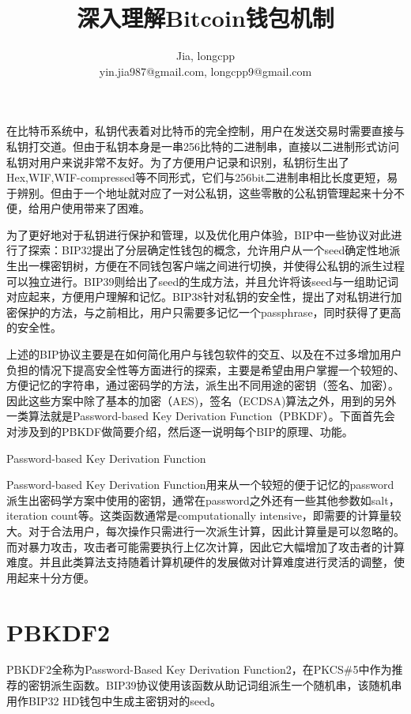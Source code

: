 \documentclass{article}
\begin{document}
\title{深入理解Bitcoin钱包机制}
\author{Jia, longcpp \\ \small{yin.jia987@gmail.com, longcpp9@gmail.com}}

\maketitle


在比特币系统中，私钥代表着对比特币的完全控制，用户在发送交易时需要直接与私钥打交道。但由于私钥本身是一串256比特的二进制串，直接以二进制形式访问私钥对用户来说非常不友好。为了方便用户记录和识别，私钥衍生出了Hex,WIF,WIF-compressed等不同形式，它们与256bit二进制串相比长度更短，易于辨别。但由于一个地址就对应了一对公私钥，这些零散的公私钥管理起来十分不便，给用户使用带来了困难。

为了更好地对于私钥进行保护和管理，以及优化用户体验，BIP中一些协议对此进行了探索：BIP32提出了分层确定性钱包的概念，允许用户从一个seed确定性地派生出一棵密钥树，方便在不同钱包客户端之间进行切换，并使得公私钥的派生过程可以独立进行。BIP39则给出了seed的生成方法，并且允许将该seed与一组助记词对应起来，方便用户理解和记忆。BIP38针对私钥的安全性，提出了对私钥进行加密保护的方法，与之前相比，用户只需要多记忆一个passphrase，同时获得了更高的安全性。

上述的BIP协议主要是在如何简化用户与钱包软件的交互、以及在不过多增加用户负担的情况下提高安全性等方面进行的探索，主要是希望由用户掌握一个较短的、方便记忆的字符串，通过密码学的方法，派生出不同用途的密钥（签名、加密）。因此这些方案中除了基本的加密（AES)，签名（ECDSA)算法之外，用到的另外一类算法就是Password-based Key Derivation Function（PBKDF）。下面首先会对涉及到的PBKDF做简要介绍，然后逐一说明每个BIP的原理、功能。

Password-based Key Derivation Function

Password-based Key Derivation Function用来从一个较短的便于记忆的password派生出密码学方案中使用的密钥，通常在password之外还有一些其他参数如salt，iteration count等。这类函数通常是computationally intensive，即需要的计算量较大。对于合法用户，每次操作只需进行一次派生计算，因此计算量是可以忽略的。而对暴力攻击，攻击者可能需要执行上亿次计算，因此它大幅增加了攻击者的计算难度。并且此类算法支持随着计算机硬件的发展做对计算难度进行灵活的调整，使用起来十分方便。

\section{PBKDF2}

PBKDF2全称为Password-Based Key Derivation Function2，在PKCS\#5中作为推荐的密钥派生函数。BIP39协议使用该函数从助记词组派生一个随机串，该随机串用作BIP32 HD钱包中生成主密钥对的seed。  
\end{document}
